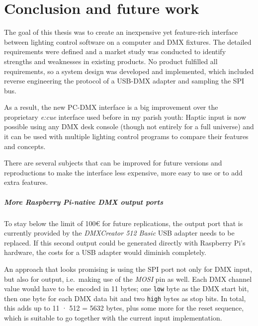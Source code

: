 \cleardoublepage\hypertarget{sec:outlook}{\chapter{Conclusion and future
work}\label{sec:outlook}}

The goal of this thesis was to create an inexpensive yet feature-rich
interface between lighting control software on a computer and DMX
fixtures. The detailed requirements were defined and a market study was
conducted to identify strengths and weaknesses in existing products. No
product fulfilled all requirements, so a system design was developed and
implemented, which included reverse engineering the protocol of a
USB-DMX adapter and sampling the SPI bus.

As a result, the new PC-DMX interface is a big improvement over the
proprietary \emph{e:cue} interface used before in my parish youth:
Haptic input is now possible using any DMX desk console (though not
entirely for a full universe) and it can be used with multiple lighting
control programs to compare their features and concepts.

There are several subjects that can be improved for future versions and
reproductions to make the interface less expensive, more easy to use or
to add extra features.

\paragraph{More Raspberry Pi-native DMX output
ports}\label{more-raspberry-pi-native-dmx-output-ports}

To stay below the limit of 100\euro{} for future replications, the
output port that is currently provided by the \emph{DMXCreator 512
Basic} USB adapter needs to be replaced. If this second output could be
generated directly with Raspberry Pi's hardware, the costs for a USB
adapter would diminish completely.

An approach that looks promising is using the SPI port not only for DMX
input, but also for output, i.e.~making use of the \emph{MOSI} pin as
well. Each DMX channel value would have to be encoded in 11 bytes; one
\colorbox{WhiteSmoke}{\lstinline!low!} byte as the DMX start bit, then one byte for each DMX
data bit and two \colorbox{WhiteSmoke}{\lstinline!high!} bytes as stop bits. In total, this
adds up to 11 · 512 = 5632 bytes, plus some more for the reset sequence,
which is suitable to go together with the current input implementation.

